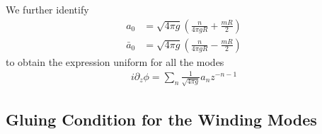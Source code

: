 We further identify
\begin{equation}
\begin{aligned}
  a_0 &= \sqrt{ 4 \pi g } \left( \frac{n}{4\pi g R} + \frac{m R }{2} \right) \\
   \bar{a}_0 &= \sqrt{ 4 \pi g } \left( \frac{n}{4\pi g R} - \frac{m R }{2} \right)
  \end{aligned}
\end{equation}
to obtain the expression uniform for all the modes
\begin{equation}
\begin{aligned}
i \partial_z \phi =  \sum_n \frac{1}{\sqrt{4\pi g}} a_n z^{-n-1} 
\end{aligned}
\end{equation}

\subsection{Gluing Condition for the Winding Modes}
\label{app_sub:compact_gluing_boundary}

